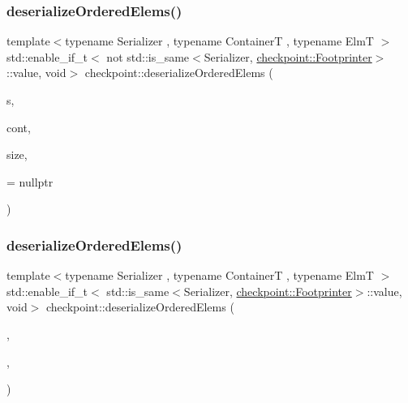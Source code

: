 \subsubsection{\texorpdfstring{deserialize\+Ordered\+Elems()}{deserializeOrderedElems()}\hspace{0.1cm}{\footnotesize\ttfamily [2/3]}}
{\footnotesize\ttfamily template$<$typename Serializer , typename ContainerT , typename ElmT $>$ \\
std\+::enable\+\_\+if\+\_\+t$<$ not std\+::is\+\_\+same$<$Serializer, \hyperlink{structcheckpoint_1_1_footprinter}{checkpoint\+::\+Footprinter}$>$\+::value, void$>$ checkpoint\+::deserialize\+Ordered\+Elems (\begin{DoxyParamCaption}\item[{Serializer \&}]{s,  }\item[{ContainerT \&}]{cont,  }\item[{typename Container\+T\+::size\+\_\+type}]{size,  }\item[{\hyperlink{namespacecheckpoint_a141a100f9dcca06fb0b6dbf44a5d6756}{is\+Not\+Copy\+Constructible}$<$ ElmT $>$ $\ast$}]{ = {\ttfamily nullptr} }\end{DoxyParamCaption})\hspace{0.3cm}{\ttfamily [inline]}}

\mbox{\label{namespacecheckpoint_a1022e2741b325048a74569a985eb7711}} 
\subsubsection{\texorpdfstring{deserialize\+Ordered\+Elems()}{deserializeOrderedElems()}\hspace{0.1cm}{\footnotesize\ttfamily [3/3]}}
{\footnotesize\ttfamily template$<$typename Serializer , typename ContainerT , typename ElmT $>$ \\
std\+::enable\+\_\+if\+\_\+t$<$ std\+::is\+\_\+same$<$Serializer, \hyperlink{structcheckpoint_1_1_footprinter}{checkpoint\+::\+Footprinter}$>$\+::value, void$>$ checkpoint\+::deserialize\+Ordered\+Elems (\begin{DoxyParamCaption}\item[{Serializer \&}]{,  }\item[{ContainerT \&}]{,  }\item[{typename Container\+T\+::size\+\_\+type}]{ }\end{DoxyParamCaption})\hspace{0.3cm}{\ttfamily [inline]}}

